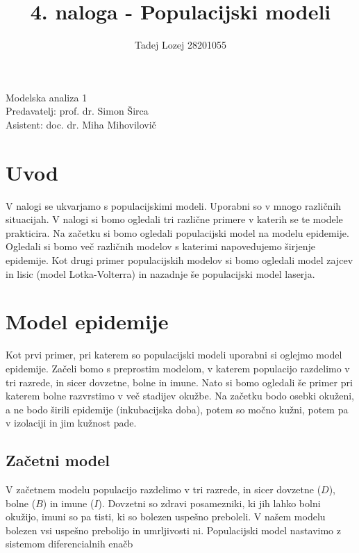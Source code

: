 \documentclass[slovene,11pt,a4paper]{article}
\begin{document}
\title{4. naloga - Populacijski modeli}
\author{Tadej Lozej 28201055}
\maketitle
\begin{center}
Modelska analiza 1 \\
\bigskip
Predavatelj: prof. dr. Simon Širca \\
Asistent: doc. dr. Miha Mihovilovič
\end{center}

\newpage

\tableofcontents

\newpage

\section{Uvod}


V nalogi se ukvarjamo s populacijskimi modeli. Uporabni so v mnogo različnih situacijah. V nalogi si bomo ogledali tri različne primere v katerih se te modele prakticira. Na začetku si bomo ogledali populacijski model na modelu epidemije. Ogledali si bomo več različnih modelov s katerimi napovedujemo širjenje epidemije. Kot drugi primer populacijskih modelov si bomo ogledali model zajcev in lisic (model Lotka-Volterra) in nazadnje še populacijski model laserja.

\section{Model epidemije}

Kot prvi primer, pri katerem so populacijski modeli uporabni si oglejmo model epidemije. Začeli bomo s preprostim modelom, v katerem populacijo razdelimo v tri razrede, in sicer dovzetne, bolne in imune. Nato si bomo ogledali še primer pri katerem bolne razvrstimo v več stadijev okužbe. Na začetku bodo osebki okuženi, a ne bodo širili epidemije (inkubacijska doba), potem so močno kužni, potem pa v izolaciji in jim kužnost pade.

\subsection{Začetni model}

V začetnem modelu populacijo razdelimo v tri razrede, in sicer dovzetne ($D$), bolne ($B$) in imune ($I$). Dovzetni so zdravi posamezniki, ki jih lahko bolni okužijo, imuni so pa tisti, ki so bolezen uspešno preboleli. V našem modelu bolezen vsi uspešno prebolijo in umrljivosti ni. Populacijski model nastavimo z sistemom diferencialnih enačb
\end{document}
